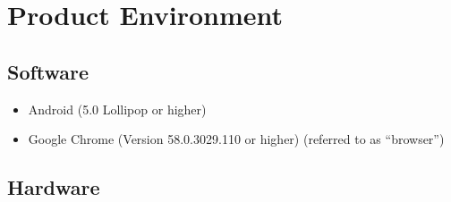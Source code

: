 \section{Product Environment}

\subsection{Software}

\begin{itemize}
  \item Android (5.0 Lollipop or higher)
  \item Google Chrome (Version 58.0.3029.110 or higher) (referred to as ``browser'')
\end{itemize}

\subsection{Hardware}

